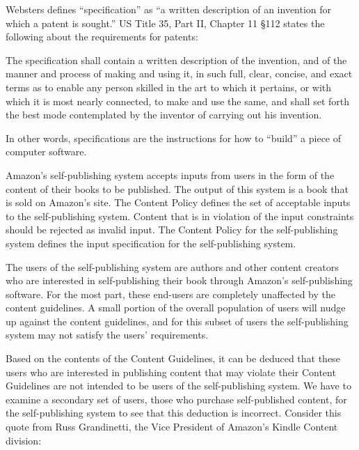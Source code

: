 \documentclass[11pt]{article}
\begin{document}
\begin{multicols}{2}
Websters defines ``specification'' as ``a written description of an invention for which a patent is sought.'' \cite{WebsterOnlineDict}  US Title 35, Part II, Chapter 11 \S 112 states the following about the requirements for patents:

{\addtolength{\leftskip}{6mm}

The specification shall contain a written description of the invention, and of the manner and process of making and using it, in such full, clear, concise, and exact terms as to enable any person skilled in the art to which it pertains, or with which it is most nearly connected, to make and use the same, and shall set forth the best mode contemplated by the inventor of carrying out his invention.  \cite{Title35}

}

In other words, specifications are the instructions for how to ``build'' a piece of computer software.

Amazon's self-publishing system accepts inputs from users in the form of the content of their books to be published.  The output of this system is a book that is sold on Amazon's site.  The Content Policy defines the set of acceptable inputs to the self-publishing system.  Content that is in violation of the input constraints should be rejected as invalid input.  The Content Policy for the self-publishing system defines the input specification for the self-publishing system. 

The users of the self-publishing system are authors and other content creators who are interested in self-publishing their book through Amazon's self-publishing software.  For the most part, these end-users are completely unaffected by the content guidelines.  A small portion of the overall population of users will nudge up against the content guidelines, and for this subset of users the self-publishing system may not satisfy the users' requirements.

Based on the contents of the Content Guidelines, it can be deduced that these users who are interested in publishing content that may violate their Content Guidelines are not intended to be users of the self-publishing system.  We have to examine a secondary set of users, those who purchase self-published content, for the self-publishing system to see that this deduction is incorrect.  Consider this quote from Russ Grandinetti, the Vice President of Amazon's Kindle Content division:

{\addtolength{\leftskip}{6mm}

}
\end{multicols}
\end{document}
